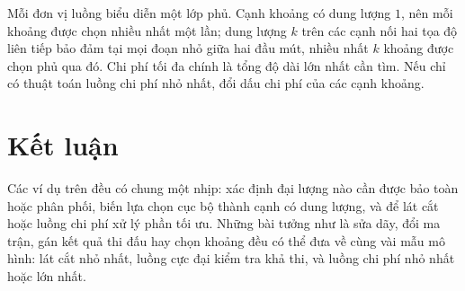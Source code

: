 \documentclass[11pt]{article}
\begin{document}
Mỗi đơn vị luồng biểu diễn một lớp phủ. Cạnh khoảng có dung lượng \(1\), nên
mỗi khoảng được chọn nhiều nhất một lần; dung lượng \(k\) trên các cạnh nối
hai tọa độ liên tiếp bảo đảm tại mọi đoạn nhỏ giữa hai đầu mút, nhiều nhất
\(k\) khoảng được chọn phủ qua đó. Chi phí tối đa chính là tổng độ dài lớn
nhất cần tìm. Nếu chỉ có thuật toán luồng chi phí nhỏ nhất, đổi dấu chi phí
của các cạnh khoảng.

\section*{Kết luận}

Các ví dụ trên đều có chung một nhịp: xác định đại lượng nào cần được bảo toàn
hoặc phân phối, biến lựa chọn cục bộ thành cạnh có dung lượng, và để lát cắt
hoặc luồng chi phí xử lý phần tối ưu. Những bài tưởng như là sửa dãy, đổi ma
trận, gán kết quả thi đấu hay chọn khoảng đều có thể đưa về cùng vài mẫu mô
hình: lát cắt nhỏ nhất, luồng cực đại kiểm tra khả thi, và luồng chi phí nhỏ
nhất hoặc lớn nhất.
\end{document}
